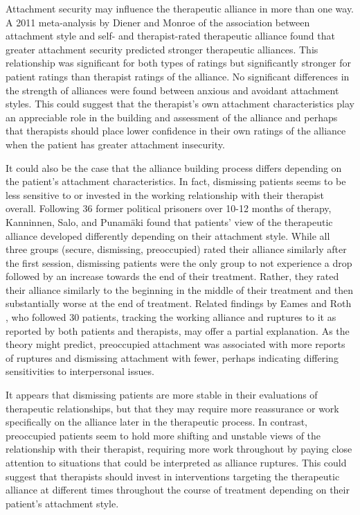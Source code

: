 \documentclass[12pt]{report}
\begin{document}
Attachment security may influence the therapeutic alliance in more than one way.
A 2011 meta-analysis by Diener and Monroe \cite{Diener2011} of the association between attachment style and self- and therapist-rated therapeutic alliance found that greater attachment security predicted stronger therapeutic alliances. This relationship was significant for both types of ratings but significantly stronger for patient ratings than therapist ratings of the alliance.
No significant differences in the strength of alliances were found between anxious and avoidant attachment styles.
This could suggest that the therapist's own attachment characteristics play an appreciable role in the building and assessment of the alliance and perhaps that therapists should place lower confidence in their own ratings of the alliance when the patient has greater attachment insecurity.

It could also be the case that the alliance building process differs depending on the patient's attachment characteristics.
In fact, dismissing patients seems to be less sensitive to or invested in the working relationship with their therapist overall. Following 36 former political prisoners over 10-12 months of therapy, Kanninnen, Salo, and Punamäki \cite{Kanninen2000} found that patients' view of the therapeutic alliance developed differently depending on their attachment style.
While all three groups (secure, dismissing, preoccupied) rated their alliance similarly after the first session, dismissing patients were the only group to not experience a drop followed by an increase towards the end of their treatment.
Rather, they rated their alliance similarly to the beginning in the middle of their treatment and then substantially worse at the end of treatment.
Related findings by Eames and Roth \cite{Eames2000}, who followed 30 patients, tracking the working alliance and ruptures to it as reported by both patients and therapists, may offer a partial explanation.
As the theory might predict, preoccupied attachment was associated with more reports of ruptures and dismissing attachment with fewer, perhaps indicating differing sensitivities to interpersonal issues.

It appears that dismissing patients are more stable in their evaluations of therapeutic relationships, but that they may require more reassurance or work specifically on the alliance later in the therapeutic process.
In contrast, preoccupied patients seem to hold more shifting and unstable views of the relationship with their therapist, requiring more work throughout by paying close attention to situations that could be interpreted as alliance ruptures.
This could suggest that therapists should invest in interventions targeting the therapeutic alliance at different times throughout the course of treatment depending on their patient's attachment style.
\end{document}
